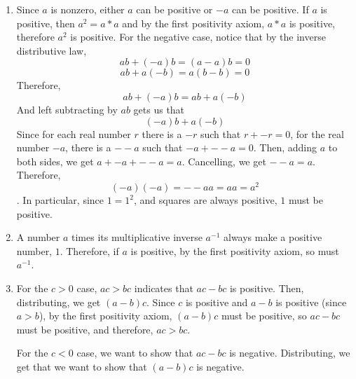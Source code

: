 \documentclass{article}
\begin{document}
\begin{solution}
\begin{enumerate}
    \item Since $a$ is nonzero, either $a$ can be positive or $-a$ can be positive. If $a$ is positive, then $a^2 = a*a$ and by the first positivity axiom, $a*a$ is positive, therefore $a^2$ is positive. For the negative case, notice that by the inverse distributive law, $$ab + (-a)b = (a-a)b = 0$$ $$ab + a(-b) = a(b-b) = 0$$Therefore, $$ab + (-a)b = ab + a(-b)$$And left subtracting by $ab$ gets us that $$(-a)b + a(-b)$$Since for each real number $r$ there is a $-r$ such that $r + -r = 0$, for the real number $-a$, there is a $--a$ such that $-a + --a = 0$. Then, adding $a$ to both sides, we get $a + -a + --a = a$. Cancelling, we get $--a = a$. Therefore, $$(-a)(-a) = --aa = aa = a^2$$. In particular, since $1 = 1^2$, and squares are always positive, $1$ must be positive.
    \item A number $a$ times its multiplicative inverse $a ^{-1}$ always make a positive number, $1$. Therefore, if $a$ is positive, by the first positivity axiom, so must $a ^{-1}$. 
    \item For the $c>0$ case, $ac > bc$ indicates that $ac - bc$ is positive. Then, distributing, we get $(a-b)c$. Since $c$ is positive and $a-b$ is positive (since $a>b$), by the first positivity axiom, $(a-b)c$ must be positive, so $ac-bc$ must be positive, and therefore, $ac > bc$. 
    
    For the $c<0$ case, we want to show that $ac - bc$ is negative. Distributing, we get that we want to show that $(a-b)c$ is negative. 
\end{enumerate}
\end{solution}
\end{document}
